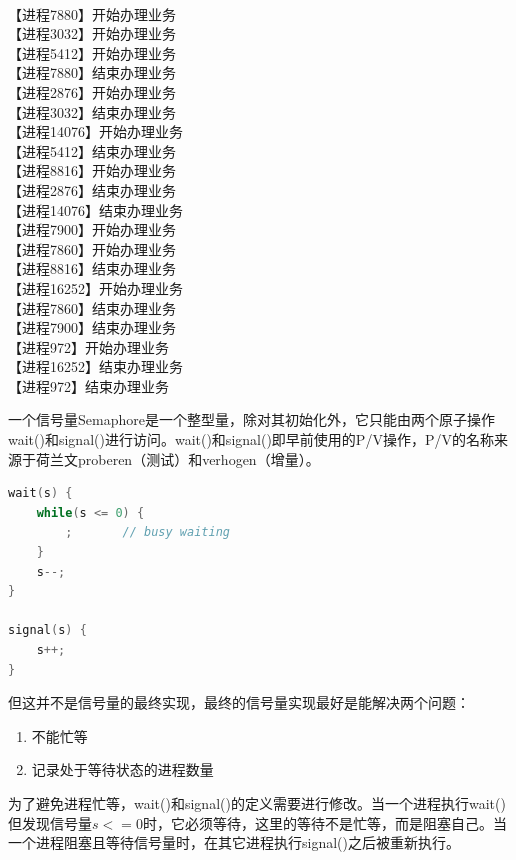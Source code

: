 \begin{tcolorbox}
	 \\
	【进程7880】开始办理业务 \\
	【进程3032】开始办理业务 \\
	【进程5412】开始办理业务 \\
	【进程7880】结束办理业务 \\
	【进程2876】开始办理业务 \\
	【进程3032】结束办理业务 \\
	【进程14076】开始办理业务 \\
	【进程5412】结束办理业务 \\
	【进程8816】开始办理业务 \\
	【进程2876】结束办理业务 \\
	【进程14076】结束办理业务 \\
	【进程7900】开始办理业务 \\
	【进程7860】开始办理业务 \\
	【进程8816】结束办理业务 \\
	【进程16252】开始办理业务 \\
	【进程7860】结束办理业务 \\
	【进程7900】结束办理业务 \\
	【进程972】开始办理业务 \\
	【进程16252】结束办理业务 \\
	【进程972】结束办理业务
\end{tcolorbox}

一个信号量Semaphore是一个整型量，除对其初始化外，它只能由两个原子操作wait()和signal()进行访问。wait()和signal()即早前使用的P/V操作，P/V的名称来源于荷兰文proberen（测试）和verhogen（增量）。

\begin{lstlisting}[language=C]
wait(s) {
	while(s <= 0) {
		;		// busy waiting
	}
	s--;
}

signal(s) {
	s++;
}
\end{lstlisting}

但这并不是信号量的最终实现，最终的信号量实现最好是能解决两个问题：

\begin{enumerate}
	\item 不能忙等
	\item 记录处于等待状态的进程数量
\end{enumerate}

为了避免进程忙等，wait()和signal()的定义需要进行修改。当一个进程执行wait()但发现信号量$ s <= 0 $时，它必须等待，这里的等待不是忙等，而是阻塞自己。当一个进程阻塞且等待信号量时，在其它进程执行signal()之后被重新执行。 \\

